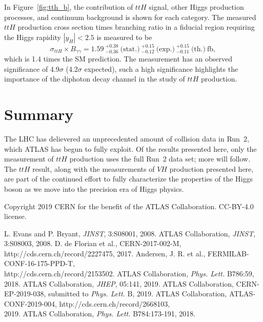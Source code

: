 \documentclass{moriond}
\begin{document}
In Figure~\ref{fig:tth_b}, the contribution of $ttH$ signal, other Higgs
production processes, and continuum background is shown for each category.
The measured $ttH$ production cross section times branching ratio in a fiducial region requiring the
Higgs rapidity $|y_H|<2.5$ is measured to be
%
\begin{equation}
\sigma_{ttH} \times B_{\gamma\gamma} = 1.59~^{+0.38}_{-0.36} ~\textrm{(stat.)}
~^{+0.15}_{-0.12} ~\textrm{(exp.)}
~^{+0.15}_{-0.11} ~\textrm{(th.)}~\textrm{fb},
\end{equation}
%
which is 1.4 times the SM prediction.
The measurement has an observed significance of 4.9$\sigma$ (4.2$\sigma$ expected),
such a high significance
highlights the importance of the diphoton decay channel in the study of $ttH$ production.



\section{Summary}

The LHC has delievered an unprecedented amount of collision data in Run~2, which ATLAS has begun to
fully exploit. Of the results presented here, only the measurement of $ttH$ production uses the full
Run~2 data set; more will follow.
The $ttH$ result, along with the measurements of $VH$
production presented here, are part of the continued effort to fully characterize the properties
of the Higgs boson as we move into the precision era of Higgs physics.

\phantom{.}

\noindent
Copyright 2019 CERN for the benefit of the ATLAS Collaboration. CC-BY-4.0 license.

\begin{thebibliography}{99}
 L. Evans and P. Bryant, {\em JINST}, 3:S08001, 2008.
 ATLAS Collaboration, {\em JINST}, 3:S08003, 2008.
 D. de Florian et al., CERN-2017-002-M, http://cds.cern.ch/record/2227475, 2017.
 Andersen, J. R. et al., FERMILAB-CONF-16-175-PPD-T,\\ http://cds.cern.ch/record/2153502.
 ATLAS Collaboration, {\em Phys. Lett.} B786:59, 2018.
 ATLAS Collaboration, {\em JHEP}, 05:141, 2019.
 ATLAS Collaboration, CERN-EP-2019-038, submitted to {\em Phys. Lett.} B, 2019.
 ATLAS Collaboration, ATLAS-CONF-2019-004, http://cds.cern.ch/record/2668103,\\ 2019.
 ATLAS Collaboration, {\em Phys. Lett.} B784:173-191, 2018.
\end{thebibliography}

%
\end{document}
